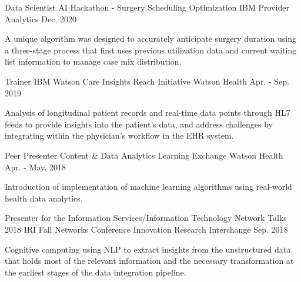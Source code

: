 

\begin{cventries}

  \cventry
    {Data Scientist} %
    {AI Hackathon - Surgery Scheduling Optimization} %
    {IBM Provider Analytics} %
    {Dec. 2020} %
    {
      \begin{cvcompactparagraph}
       A unique algorithm was designed to accurately anticipate surgery duration using a three-stage process that first uses previous utilization data and current waiting list information to manage case mix distribution.
      \end{cvcompactparagraph}
    }

  \cventry
    {Trainer} %
    {IBM Watson Care Insights Reach Initiative} %
    {Watson Health} %
    {Apr. - Sep. 2019} %
    {
      \begin{cvcompactparagraph}
        Analysis of longitudinal patient records and real-time data points through HL7 feeds to provide insights into the patient’s data, and address challenges by integrating within the physician's workflow in the EHR system.
      \end{cvcompactparagraph}
    }

  \cventry
    {Peer Presenter} %
    {Content \& Data Analytics Learning Exchange} %
    {Watson Health} %
    {Apr. - May. 2018} %
    {
      \begin{cvcompactparagraph}
        Introduction of implementation of machine learning algorithms using real-world health data analytics.
      \end{cvcompactparagraph}
    }

  \cventry
    {Presenter for the Information Services/Information Technology Network Talks} %
    {2018 IRI Fall Networks Conference} %
    {Innovation Research Interchange} %
    {Sep. 2018} %
    {
      \begin{cvcompactparagraph}
        Cognitive computing using NLP to extract insights from the unstructured data that holds most of the relevant information and the necessary transformation at the earliest stages of the data integration pipeline.
      \end{cvcompactparagraph}
    }


\end{cventries}

